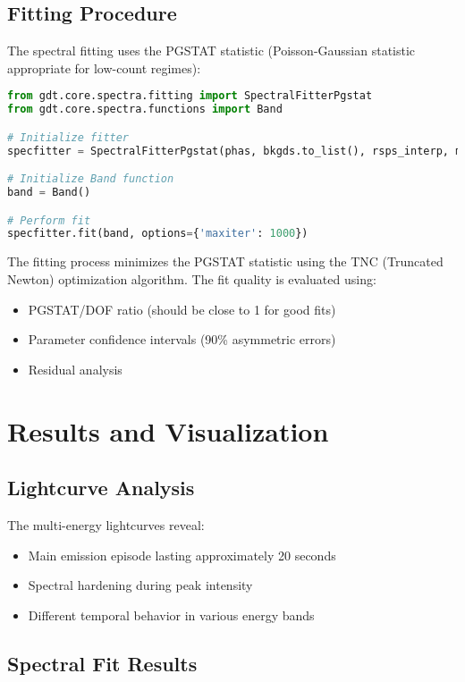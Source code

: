\documentclass{article}
\begin{document}
\subsection{Fitting Procedure}

The spectral fitting uses the PGSTAT statistic (Poisson-Gaussian statistic appropriate for low-count regimes):

\begin{lstlisting}[language=Python]
from gdt.core.spectra.fitting import SpectralFitterPgstat
from gdt.core.spectra.functions import Band

# Initialize fitter
specfitter = SpectralFitterPgstat(phas, bkgds.to_list(), rsps_interp, method='TNC')

# Initialize Band function
band = Band()

# Perform fit
specfitter.fit(band, options={'maxiter': 1000})
\end{lstlisting}

The fitting process minimizes the PGSTAT statistic using the TNC (Truncated Newton) optimization algorithm. The fit quality is evaluated using:

\begin{itemize}
    \item PGSTAT/DOF ratio (should be close to 1 for good fits)
    \item Parameter confidence intervals (90\% asymmetric errors)
    \item Residual analysis
\end{itemize}

\section{Results and Visualization}

\subsection{Lightcurve Analysis}

The multi-energy lightcurves reveal:
\begin{itemize}
    \item Main emission episode lasting approximately 20 seconds
    \item Spectral hardening during peak intensity
    \item Different temporal behavior in various energy bands
\end{itemize}

\subsection{Spectral Fit Results}
\end{document}
